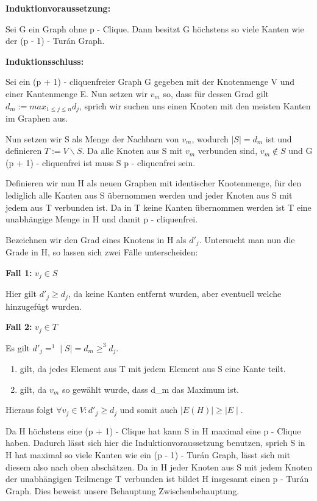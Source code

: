 \documentclass[12pt, a4paper]{article}
\begin{document}
\textbf{Induktionvoraussetzung:}

Sei G ein Graph ohne p - Clique. Dann besitzt G höchstens so viele Kanten wie der (p - 1) - Turán Graph.

\textbf{Induktionsschluss:}

Sei ein (p + 1) - cliquenfreier Graph G gegeben mit der Knotenmenge V und einer Kantenmenge E. Nun setzen wir $v_m$ so, dass für dessen Grad gilt $d_m := max_{1 \le j \le n} d_j$, sprich wir suchen uns einen Knoten mit den meisten Kanten im Graphen aus.

Nun setzen wir S als Menge der Nachbarn von $v_m$, wodurch $\mid S \mid = d_m$ ist und definieren $T := V \backslash S$. Da alle Knoten aus S mit $v_m$ verbunden sind, $v_m \notin S$ und G (p + 1) - cliquenfrei ist muss S p - cliquenfrei sein.

Definieren wir nun H als neuen Graphen mit identischer Knotenmenge, für den lediglich alle Kanten aus S übernommen werden und jeder Knoten aus S mit jedem aus T verbunden ist. Da in T keine Kanten übernommen werden ist T eine unabhängige Menge in H und damit p - cliquenfrei.

Bezeichnen wir den Grad eines Knotens in H als $d'_j$. Untersucht man nun die Grade in H, so lassen sich zwei Fälle unterscheiden:

\textbf{Fall 1:} $v_j \in S$

Hier gilt $d'_j \ge d_j$, da keine Kanten entfernt wurden, aber eventuell welche hinzugefügt wurden.

\textbf{Fall 2:} $v_j \in T$

Es gilt $d'_j =^1 \mid S \mid = d_m \ge^3 d_j$.
\begin{enumerate}
\item {} 
gilt, da jedes Element aus T mit jedem Element aus S eine Kante teilt.

\item {} 
gilt, da $v_m$ so gewählt wurde, dass d\_m das Maximum ist.

\end{enumerate}

Hieraus folgt $\forall v_j \in V: d'_j \ge d_j$ und somit auch $\mid E(H) \mid \ge \mid E \mid$.

Da H höchstens eine (p + 1) - Clique hat kann S in H maximal eine p - Clique haben. Dadurch lässt sich hier die Induktionvoraussetzung benutzen, sprich S in H hat maximal so viele Kanten wie ein (p - 1) - Turán Graph, lässt sich mit diesem also nach oben abschätzen. Da in H jeder Knoten aus S mit jedem Knoten der unabhängigen Teilmenge T verbunden ist bildet H insgesamt einen p - Turán Graph. Dies beweist unsere Behauptung Zwischenbehauptung.
\end{document}
